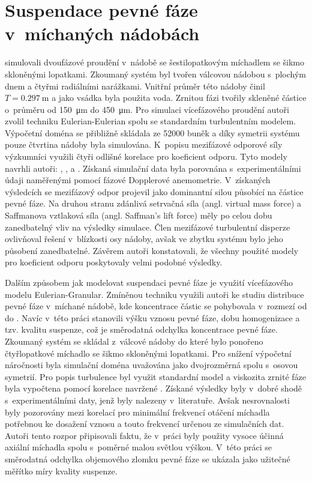 \section{Suspendace pevné fáze v~míchaných nádobách}
\citet{lju01} simulovali dvoufázové proudění v~nádobě se šestilopatkovým míchadlem se šikmo skloněnými lopatkami. Zkoumaný systém byl tvořen válcovou nádobou s~plochým dnem a čtyřmi radiálními narážkami. Vnitřní průměr této nádoby činil $T=\SI{0.297}{\meter}$ a jako vsádka byla použita voda. Zrnitou fázi tvořily skleněné částice o~průměru od \SI{150}{\micro\meter} do \SI{450}{\micro\meter}. Pro simulaci vícefázového proudění autoři zvolil techniku Eulerian-Eulerian spolu se standardním \keps{} turbulentním modelem. Výpočetní doména se přibližně skládala ze \num{52000} buněk a díky symetrii systému pouze čtvrtina nádoby byla simulována. K~popisu mezifázové odporové síly výzkumníci využili čtyři odlišné korelace pro koeficient odporu. Tyto modely navrhli autoři: \citet{schi32}, \citet{ish79}, \citet{ihme72} a \citet{bru98}. Získaná simulační data byla porovnána s~experimentálními údaji naměřenými pomocí fázové Dopplerové anemometrie. V~získaných výsledcích se mezifázový odpor projevil jako dominantní silou působící na částice pevné fáze. Na druhou stranu zdánlivá setrvačná síla (angl. virtual mass force) a Saffmanova vztlaková síla (angl. Saffman's lift force) měly po celou dobu zanedbatelný vliv na výsledky simulace. Člen mezifázové turbulentní disperze ovlivňoval řešení v~blízkosti osy nádoby, avšak ve zbytku systému bylo jeho působení zanedbatelné. Závěrem autoři konstatovali, že všechny použité modely pro koeficient odporu poskytovaly velmi podobné výsledky.

Dalším způsobem jak modelovat suspendaci pevné fáze je využití vícefázového modelu Eulerian-Granular. Zmíněnou techniku využili autoři \citet{oshi02} ke studiu distribuce pevné fáze v~míchané nádobě, kde koncentrace částic se pohybovala v~rozmezí od  do . Navíc v~této práci stanovili výšku vznosu pevné fáze, dobu homogenizace a tzv. kvalitu suspenze, což je směrodatná odchylka koncentrace pevné fáze. Zkoumaný systém se skládal z~válcové nádoby do které bylo ponořeno čtyřlopatkové míchadlo se šikmo skloněnými lopatkami. Pro snížení výpočetní náročnosti byla simulační doména uvažována jako dvojrozměrná spolu s~osovou symetrií. Pro popis turbulence byl využit standardní \keps{} model a viskozita zrnité fáze byla vypočtena pomocí korelace navržené \citet{syam93}. Získané výsledky byly v~dobré shodě s~experimentálními daty, jenž byly nalezeny v~literatuře. Avšak nesrovnalosti byly pozorovány mezi korelací pro minimální frekvencí otáčení míchadla potřebnou ke dosažení vznosu a touto frekvencí určenou ze simulačních dat. Autoři tento rozpor připisovali faktu, že v~práci byly použity vysoce účinná axiální míchadla spolu s~poměrné malou světlou výškou. V~této práci se směrodatná odchylka objemového zlomku pevné fáze se ukázala jako užitečné měřítko míry kvality suspenze.        

